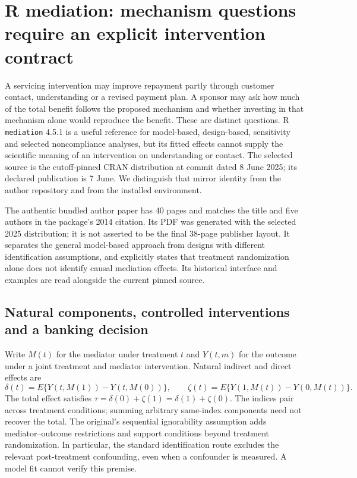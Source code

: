 \section{R mediation: mechanism questions require an explicit intervention contract}
\label{sec:exec24-mediation-reuse}

A servicing intervention may improve repayment partly through customer contact,
understanding or a revised payment plan. A sponsor may ask how much of the total
benefit follows the proposed mechanism and whether investing in that mechanism
alone would reproduce the benefit. These are distinct questions. R
\texttt{mediation} 4.5.1 is a useful reference for model-based, design-based,
sensitivity and selected noncompliance analyses, but its fitted effects cannot
supply the scientific meaning of an intervention on understanding or contact.
The selected source is the cutoff-pinned CRAN distribution at commit dated
8 June 2025; its declared publication is 7 June. We distinguish that mirror
identity from the author repository and from the installed environment.
\citep{exec24_mediation_sources}

The authentic bundled author paper has 40 pages and matches the title and five
authors in the package's 2014 citation. Its PDF was generated with the selected
2025 distribution; it is not asserted to be the final 38-page publisher layout.
It separates the general model-based approach from designs with different
identification assumptions, and explicitly states that treatment randomization
alone does not identify causal mediation effects. Its historical interface and
examples are read alongside the current pinned source.
\citep{exec24_mediation_original}

\subsection{Natural components, controlled interventions and a banking decision}
Write $M(t)$ for the mediator under treatment $t$ and $Y(t,m)$ for the outcome
under a joint treatment and mediator intervention. Natural indirect and direct
effects are
\[
 \delta(t)=E\{Y(t,M(1))-Y(t,M(0))\},\qquad
 \zeta(t)=E\{Y(1,M(t))-Y(0,M(t))\}.
\]
The total effect satisfies $\tau=\delta(0)+\zeta(1)=\delta(1)+\zeta(0)$.
The indices pair across treatment conditions; summing arbitrary same-index
components need not recover the total. The original's sequential ignorability
assumption adds mediator--outcome restrictions and support conditions beyond
treatment randomization. In particular, the standard identification route
excludes the relevant post-treatment confounding, even when a confounder is
measured. A model fit cannot verify this premise.
\citep{exec24_mediation_original}

